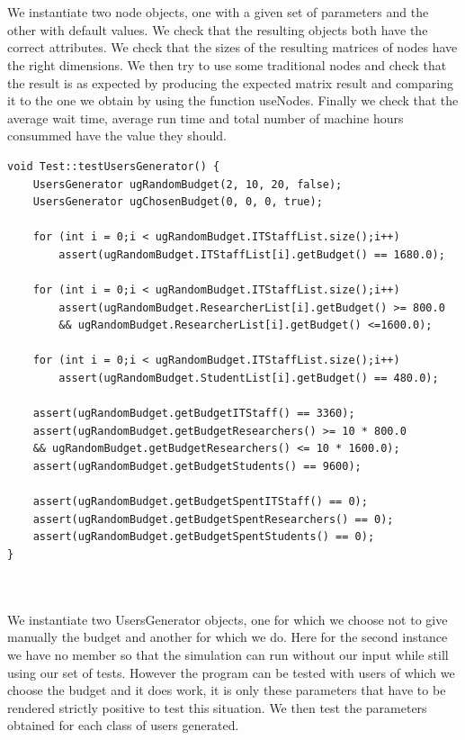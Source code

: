 \documentclass [10 pt, a4 paper]{report}
\begin{document}
\noindent
\\ \\ 
We instantiate two node objects, one with a given set of parameters and the other with default values. We check that the resulting objects both have the correct attributes. We check that the sizes of the resulting matrices of nodes have the right dimensions. We then try to use some traditional nodes and check that the result is as expected by producing the expected matrix result and comparing it to the one we obtain by using the function useNodes. Finally we check that the average wait time, average run time and total number of machine hours consummed have the value they should.

\clearpage
\begin{lstlisting}[caption=testUsersGenerator function of the class Test, label={lst:code1}, frame=single]
void Test::testUsersGenerator() {
	UsersGenerator ugRandomBudget(2, 10, 20, false);
	UsersGenerator ugChosenBudget(0, 0, 0, true);

	for (int i = 0;i < ugRandomBudget.ITStaffList.size();i++)
		assert(ugRandomBudget.ITStaffList[i].getBudget() == 1680.0);
	
	for (int i = 0;i < ugRandomBudget.ITStaffList.size();i++)
		assert(ugRandomBudget.ResearcherList[i].getBudget() >= 800.0 
		&& ugRandomBudget.ResearcherList[i].getBudget() <=1600.0);

	for (int i = 0;i < ugRandomBudget.ITStaffList.size();i++)
		assert(ugRandomBudget.StudentList[i].getBudget() == 480.0);

	assert(ugRandomBudget.getBudgetITStaff() == 3360);
	assert(ugRandomBudget.getBudgetResearchers() >= 10 * 800.0 
	&& ugRandomBudget.getBudgetResearchers() <= 10 * 1600.0);
	assert(ugRandomBudget.getBudgetStudents() == 9600);

	assert(ugRandomBudget.getBudgetSpentITStaff() == 0);
	assert(ugRandomBudget.getBudgetSpentResearchers() == 0);
	assert(ugRandomBudget.getBudgetSpentStudents() == 0);
}
\end{lstlisting}

\noindent
\\ \\ 
We instantiate two UsersGenerator objects, one for which we choose not to give manually the budget and another for which we do. Here for the second instance we have no member so that the simulation can run without our input while still using our set of tests. However the program can be tested with users of which we choose the budget and it does work, it is only these parameters that have to be rendered strictly positive to test this situation. We then test the parameters obtained for each class of users generated.
\end{document}
